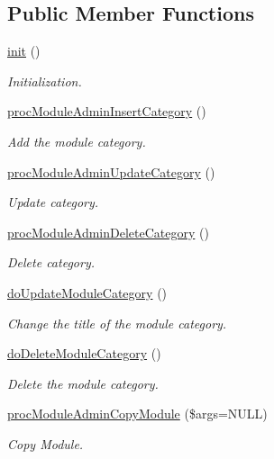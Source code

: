 \subsection*{Public Member Functions}
\begin{DoxyCompactItemize}
\item 
\hyperlink{classmoduleAdminController_a837ce6924f939b13b35325690da032d2}{init} ()
\begin{DoxyCompactList}\small\item\em Initialization. \end{DoxyCompactList}\item 
\hyperlink{classmoduleAdminController_a63e53d2b8c360b3b2c03fd18d8f25d41}{proc\-Module\-Admin\-Insert\-Category} ()
\begin{DoxyCompactList}\small\item\em Add the module category. \end{DoxyCompactList}\item 
\hyperlink{classmoduleAdminController_a75e4a9dfbc37befe7ab2758c62322821}{proc\-Module\-Admin\-Update\-Category} ()
\begin{DoxyCompactList}\small\item\em Update category. \end{DoxyCompactList}\item 
\hyperlink{classmoduleAdminController_a49c74e7b6a1ad06aeea82a0f1993b147}{proc\-Module\-Admin\-Delete\-Category} ()
\begin{DoxyCompactList}\small\item\em Delete category. \end{DoxyCompactList}\item 
\hyperlink{classmoduleAdminController_a90d82f2c0b0716c10e246f9866c9f37f}{do\-Update\-Module\-Category} ()
\begin{DoxyCompactList}\small\item\em Change the title of the module category. \end{DoxyCompactList}\item 
\hyperlink{classmoduleAdminController_a80e37ec16dc036325888cb3890b51575}{do\-Delete\-Module\-Category} ()
\begin{DoxyCompactList}\small\item\em Delete the module category. \end{DoxyCompactList}\item 
\hyperlink{classmoduleAdminController_a0540f21334c59ffebd82e08aa24114ab}{proc\-Module\-Admin\-Copy\-Module} (\$args=N\-U\-L\-L)
\begin{DoxyCompactList}\small\item\em Copy Module. \end{DoxyCompactList}\item 

\end{DoxyCompactItemize}
